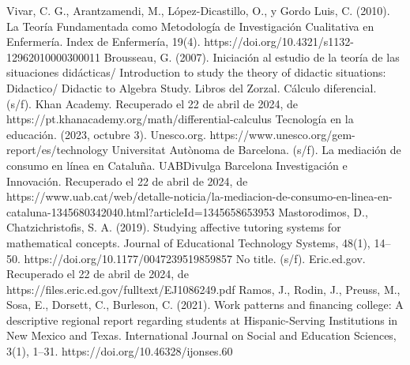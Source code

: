 \documentclass{article}
\begin{document}
\begin{thebibliography}{99}
   Vivar, C. G., Arantzamendi, M., López-Dicastillo, O., y Gordo Luis, C. (2010). La Teoría Fundamentada como Metodología de Investigación Cualitativa en Enfermería. Index de Enfermería, 19(4). https://doi.org/10.4321/s1132-12962010000300011
   Brousseau, G. (2007). Iniciación al estudio de la teoría de las situaciones didácticas/ Introduction to study the theory of didactic situations: Didactico/ Didactic to Algebra Study. Libros del Zorzal.
  Cálculo diferencial. (s/f). Khan Academy. Recuperado el 22 de abril de 2024, de https://pt.khanacademy.org/math/differential-calculus
   Tecnología en la educación. (2023, octubre 3). Unesco.org. https://www.unesco.org/gem-report/es/technology
   Universitat Autònoma de Barcelona. (s/f). La mediación de consumo en línea en Cataluña. UABDivulga Barcelona Investigación e Innovación. Recuperado el 22 de abril de 2024, de https://www.uab.cat/web/detalle-noticia/la-mediacion-de-consumo-en-linea-en-cataluna-1345680342040.html?articleId=1345658653953
   Mastorodimos, D., Chatzichristofis, S. A. (2019). Studying affective tutoring systems for mathematical concepts. Journal of Educational Technology Systems, 48(1), 14–50. https://doi.org/10.1177/0047239519859857
   No title. (s/f). Eric.ed.gov. Recuperado el 22 de abril de 2024, de https://files.eric.ed.gov/fulltext/EJ1086249.pdf
   Ramos, J., Rodin, J., Preuss, M., Sosa, E., Dorsett, C., Burleson, C. (2021). Work patterns and financing college: A descriptive regional report regarding students at Hispanic-Serving Institutions in New Mexico and Texas. International Journal on Social and Education Sciences, 3(1), 1–31. https://doi.org/10.46328/ijonses.60
  
  
\end{thebibliography}
\end{document}
